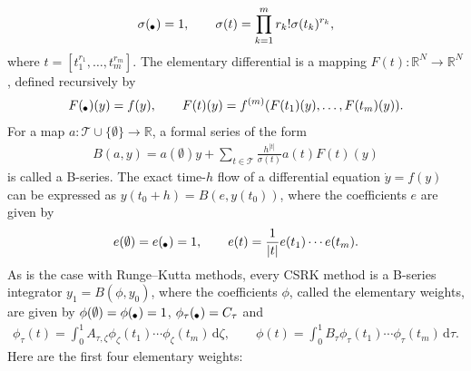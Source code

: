 \documentclass[final,leqno,onefignum,onetabnum]{siamltex1213}
\DeclarePairedDelimiter\paren{\lparen}{\rparen}
\newenvironment{tikztree}{
    \tikzpicture[grow'=up,sibling distance=0.08cm, level distance=0.2cm, baseline=-0.02cm,
    edge from parent/.style={draw, edge from parent path={(\tikzparentnode) -- (\tikzchildnode)}}]
    \tikzstyle{every node}=[draw, circle, fill=black, inner sep=1pt, minimum size=1mm]
}{\endtikzpicture}
\begin{document}
\begin{align*}
\sigma ({\begin{tikztree}
\node {};
\useasboundingbox (0.1,0);
\end{tikztree}}) = 1, \qquad
\sigma (t) = \prod_{k=1}^m r_k ! \sigma (t_k)^{r_k},
\end{align*}
where $t=[t_1^{r_1},\dots,t_m^{r_m}]$.
The elementary differential is a mapping $F(t):{\mathbb R}^N \to {\mathbb R}^N$,
defined recursively by
\begin{align*}
F({\begin{tikztree}
\node {};
\useasboundingbox (0.1,0);
\end{tikztree}}) (y) = f(y), \qquad
F(t) (y) = f^{(m)} \paren*{F(t_1)(y),\dots,F(t_m)(y)}.
\end{align*}
For a map $a:{\mathcal T}\cup\{ \emptyset\} \to{\mathbb R}$, a formal series of the form
\begin{align*}
B(a,y) = a(\emptyset) y + \sum_{t\in {\mathcal T}}\frac{h^{|t |}}{\sigma (t)}
a(t)F(t)(y)
\end{align*}
is called a B-series.
The exact time-$h$ flow of a differential equation $\dot{y}=f(y)$
can be expressed as $y(t_0+h) = B(e,y(t_0))$,
where the coefficients $e$ are given by
\begin{align*}
e(\emptyset) = e({\begin{tikztree}
\node {};
\useasboundingbox (0.1,0);
\end{tikztree}}) = 1, \qquad
e(t) = \frac{1}{|t|} e(t_1)\cdots e(t_m).
\end{align*}
As is the case with Runge--Kutta methods,
every CSRK method is a B-series integrator
$y_1 = B(\phi,y_0)$,
where the coefficients $\phi$, called the elementary weights,
are given by $\phi(\emptyset)=\phi({\begin{tikztree}
\node {};
\useasboundingbox (0.1,0);
\end{tikztree}})=1$, $\phi_\tau ({\begin{tikztree}
\node {};
\useasboundingbox (0.1,0);
\end{tikztree}})=C_\tau$
and
\begin{align*}
\phi_\tau (t) = \int_0^1 A_{\tau,\zeta}
\phi_\zeta (t_1)\cdots \phi_\zeta (t_m) \,{\mathrm d}\zeta, \qquad
\phi (t) = \int_0^1 B_\tau \phi_\tau(t_1)\cdots \phi_\tau (t_m)\,{\mathrm d}\tau.
\end{align*}
Here are the first four elementary weights:
\end{document}
